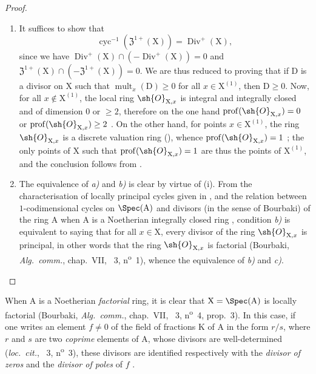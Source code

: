 \begin{proof}
\begin{enumerate}[label=(\roman*)]
  \item It suffices to show that
\[
\label{IV.21.6.9.1}
  \operatorname{cyc}^{-1}(\mathfrak{Z}^{1+}(\mathrm{X}))=\operatorname{Div}^+(\mathrm{X}),
  \tag{21.6.9.1}
\]
since we have $\operatorname{Div}^+(\mathrm{X})\cap(-\operatorname{Div}^+(\mathrm{X}))=0$ and $\mathfrak{Z}^{1+}(\mathrm{X})\cap(-\mathfrak{Z}^{1+}(\mathrm{X}))=0$.
We are thus reduced to proving that if $\mathrm{D}$ is a divisor on $\mathrm{X}$ such that $\operatorname{mult}_x(\mathrm{D})\geq 0$ for all $x\in\mathrm{X}^{(1)}$, then $\mathrm{D}\geq 0$.
Now, for all $x\notin\mathrm{X}^{(1)}$, the local ring $\sh{O}_{\mathrm{X},x}$ is integral and integrally closed and
of dimension $0$ or $\geq 2$, therefore on the one hand $\operatorname{prof}(\sh{O}_{\mathrm{X},x})=0$ or $\operatorname{prof}(\sh{O}_{\mathrm{X},x})\geq 2$ .
On the other hand, for points $x\in\mathrm{X}^{(1)}$, the ring $\sh{O}_{\mathrm{X},x}$ is a discrete valuation ring (),
whence $\operatorname{prof}(\sh{O}_{\mathrm{X},x})=1$ ;
the only points of $\mathrm{X}$ such that $\operatorname{prof}(\sh{O}_{\mathrm{X},x})=1$ are thus the points of $\mathrm{X}^{(1)}$, and the conclusion follows from .

  \item The equivalence of \emph{a)} and \emph{b)} is clear by virtue of (i).
From the characterisation of locally principal cycles given in , and the relation between $1$-codimensional cycles on $\Spec(\mathrm{A})$ and divisors (in the sense of Bourbaki) of the ring $\mathrm{A}$ when $\mathrm{A}$ is a Noetherian integrally closed ring , condition \emph{b)} is equivalent to saying that for all $x\in\mathrm{X}$, every divisor of the ring $\sh{O}_{\mathrm{X},x}$ is principal, in other words that the ring $\sh{O}_{\mathrm{X},x}$ is factorial (Bourbaki, \emph{Alg.\ comm.}, chap.~VII, \textsection~3, n\textsuperscript{o}~1), whence the equivalence of \emph{b)} and \emph{c)}.
\end{enumerate}
\end{proof}

\begin{env}[21.6.9.2]
\label{IV.21.6.9.2}
When $\mathrm{A}$ is a Noetherian \emph{factorial} ring, it is clear that $\mathrm{X}=\Spec(\mathrm{A})$ is locally factorial (Bourbaki, \emph{Alg.\ comm.}, chap.~VII, \textsection~3, n\textsuperscript{o}~4, prop.~3).
In this case, if one writes an element $f\neq 0$ of the field of fractions $\mathrm{K}$ of $\mathrm{A}$ in the form $r/s$, where $r$ and $s$ are two \emph{coprime} elements of $\mathrm{A}$, whose divisors are well-determined (\emph{loc.\ cit.}, \textsection~3, n\textsuperscript{o}~3), these divisors are identified respectively with the \emph{divisor of zeros} and the \emph{divisor of poles} of $f$ .
\end{env}

